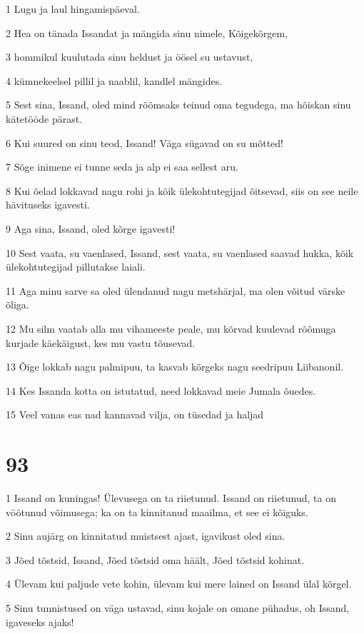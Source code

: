 \par 1 Lugu ja laul hingamispäeval.
\par 2 Hea on tänada Issandat ja mängida sinu nimele, Kõigekõrgem,
\par 3 hommikul kuulutada sinu heldust ja öösel su ustavust,
\par 4 kümnekeelsel pillil ja naablil, kandlel mängides.
\par 5 Sest sina, Issand, oled mind rõõmsaks teinud oma tegudega, ma hõiskan sinu kätetööde pärast.
\par 6 Kui suured on sinu teod, Issand! Väga sügavad on su mõtted!
\par 7 Sõge inimene ei tunne seda ja alp ei saa sellest aru.
\par 8 Kui õelad lokkavad nagu rohi ja kõik ülekohtutegijad õitsevad, siis on see neile hävituseks igavesti.
\par 9 Aga sina, Issand, oled kõrge igavesti!
\par 10 Sest vaata, su vaenlased, Issand, sest vaata, su vaenlased saavad hukka, kõik ülekohtutegijad pillutakse laiali.
\par 11 Aga minu sarve sa oled ülendanud nagu metshärjal, ma olen võitud värske õliga.
\par 12 Mu silm vaatab alla mu vihameeste peale, mu kõrvad kuulevad rõõmuga kurjade käekäigust, kes mu vastu tõusevad.
\par 13 Õige lokkab nagu palmipuu, ta kasvab kõrgeks nagu seedripuu Liibanonil.
\par 14 Kes Issanda kotta on istutatud, need lokkavad meie Jumala õuedes.
\par 15 Veel vanas eas nad kannavad vilja, on tüsedad ja haljad

\chapter{93}

\par 1 Issand on kuningas! Ülevusega on ta riietunud. Issand on riietunud, ta on vöötunud võimusega; ka on ta kinnitanud maailma, et see ei kõiguks.
\par 2 Sinu aujärg on kinnitatud muistsest ajast, igavikust oled sina.
\par 3 Jõed tõstsid, Issand, Jõed tõstsid oma häält, Jõed tõstsid kohinat.
\par 4 Ülevam kui paljude vete kohin, ülevam kui mere lained on Issand ülal kõrgel.
\par 5 Sinu tunnistused on väga ustavad, sinu kojale on omane pühadus, oh Issand, igaveseks ajaks!

